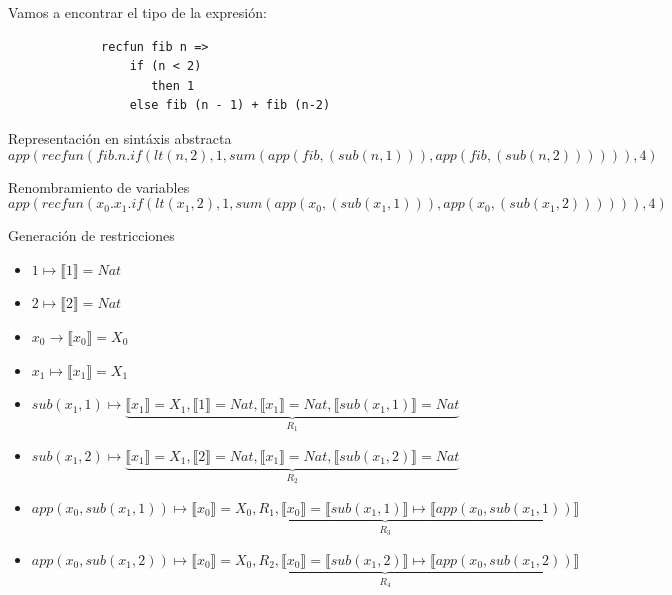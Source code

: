     \begin{exercise}
        Vamos a encontrar el tipo de la expresión:
            \begin{lstlisting}
             recfun fib n => 
                 if (n < 2) 
                    then 1
                 else fib (n - 1) + fib (n-2)
           \end{lstlisting}
        \begin{description}
	 \item Representación en sintáxis abstracta	
 	        $$app(recfun(fib.n.if(lt(n , 2), 1, sum(app(fib, (sub(n,1))),app(fib, (sub(n,2)))))),4)$$
 \bigskip
            \item Renombramiento de variables
                $$app(recfun(x_0.x_1.if(lt(x_1 , 2), 1, sum(app(x_0, (sub(x_1,1))), app(x_0, (sub(x_1,2)))))),4)$$
\bigskip
            \item Generación de restricciones
 \bigskip
            \begin{itemize}
                \item $1 \mapsto  \llbracket 1 \rrbracket = Nat$\\
                \item $2 \mapsto  \llbracket 2 \rrbracket = Nat$\\
                \item $x_0 \to  \llbracket x_0 \rrbracket = X_0$\\
                \item $x_1 \mapsto  \llbracket x_1 \rrbracket = X_1$\\ 
                \item $sub(x_1,1) \mapsto \underbrace{ \llbracket x_1 \rrbracket = X_1,  \llbracket 1 \rrbracket = Nat,  \llbracket x_1 \rrbracket = Nat,  \llbracket sub(x_1,1) \rrbracket = Nat}_{R_1}$
                \item $sub(x_1,2) \mapsto \underbrace{ \llbracket x_1 \rrbracket = X_1,  \llbracket 2 \rrbracket = Nat,  \llbracket x_1 \rrbracket = Nat,  \llbracket sub(x_1,2) \rrbracket = Nat}_{R_2}$
                \item $app(x_0, sub(x_1,1)) \mapsto \underbrace{ \llbracket x_0 \rrbracket = X_0, R_1,  \llbracket x_0 \rrbracket =  \llbracket sub(x_1,1) \rrbracket \mapsto  \llbracket app(x_0, sub(x_1,1)) \rrbracket }_{R_3}$
                \item $app(x_0, sub(x_1,2)) \mapsto \underbrace{ \llbracket x_0 \rrbracket = X_0, R_2,  \llbracket x_0 \rrbracket =  \llbracket sub(x_1,2) \rrbracket \mapsto  \llbracket app(x_0, sub(x_1,2)) \rrbracket }_{R_4}$

\end{itemize}
\end{description}
\end{exercise}
